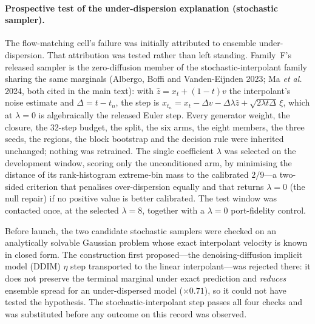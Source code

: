 \documentclass[11pt]{article}
\begin{document}
\paragraph{Prospective test of the under-dispersion explanation (stochastic sampler).}
The flow-matching cell's failure was initially attributed to ensemble under-dispersion. That
attribution was tested rather than left standing. Family~F's released sampler is the
zero-diffusion member of the stochastic-interpolant family sharing the same marginals
(Albergo, Boffi and Vanden-Eijnden 2023; Ma \emph{et al.} 2024, both cited in the
main text): with $\hat z=x_t+(1-t)v$ the interpolant's noise
estimate and $\Delta=t-t_n$, the step is
$x_{t_n}=x_t-\Delta v-\Delta\lambda\hat z+\sqrt{2\lambda t\Delta}\,\xi$, which at $\lambda=0$
is algebraically the released Euler step. Every generator weight, the closure, the 32-step
budget, the split, the six arms, the eight members, the three seeds, the regions, the block
bootstrap and the decision rule were inherited unchanged; nothing was retrained. The single
coefficient $\lambda$ was selected on the development window, scoring only the unconditioned
arm, by minimising the distance of its rank-histogram extreme-bin mass to the calibrated
$2/9$---a two-sided criterion that penalises over-dispersion equally and that returns
$\lambda=0$ (the null repair) if no positive value is better calibrated. The test window was
contacted once, at the selected $\lambda=8$, together with a $\lambda=0$ port-fidelity control.

Before launch, the two candidate stochastic samplers were checked on an analytically solvable
Gaussian problem whose exact interpolant velocity is known in closed form. The construction
first proposed---the denoising-diffusion implicit model (DDIM) $\eta$ step transported to the linear interpolant---was rejected
there: it does not preserve the terminal marginal under exact prediction and \emph{reduces}
ensemble spread for an under-dispersed model ($\times0.71$), so it could not have tested the
hypothesis. The stochastic-interpolant step passes all four checks and was substituted before
any outcome on this record was observed.
\end{document}
